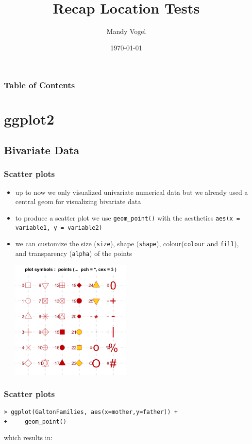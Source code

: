 \documentclass[xcolor={table}]{beamer}
\begin{document}
\title{Recap Location Tests}   
\author{Mandy Vogel} 
\date{\today}

\begin{frame}
\titlepage
\end{frame}

\begin{frame}
\frametitle{Table of Contents}\tableofcontents
\end{frame}

\section{ggplot2}
\subsection{Bivariate Data}
\begin{frame}\frametitle{Scatter plots}
  \begin{itemize}
  \item up to now we only visualized univariate numerical data but we already used a central geom for visualizing bivariate data 
  \item to produce a scatter plot we use \texttt{geom\_point()} with the aesthetics \texttt{aes(x = variable1, y = variable2)}
  \item we can customize the size (\texttt{size}), shape (\texttt{shape}), colour(\texttt{colour} and \texttt{fill}), and transparency (\texttt{alpha}) of the points 
  \begin{center}
    \includegraphics[width=6cm]{shapes.png}
  \end{center}
  \end{itemize}
\end{frame}

\begin{frame}[fragile]\frametitle{Scatter plots}
\small
\begin{verbatim}
> ggplot(GaltonFamilies, aes(x=mother,y=father)) +
+     geom_point()
\end{verbatim}
which results in:
\end{frame}
\end{document}
